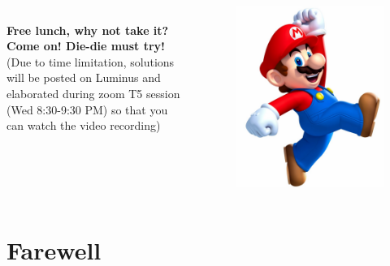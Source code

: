 \begin{frame}[fragile]{}
	\begin{columns}[t]
	\\\vspace{5pt}
	\textbf{Free lunch, why not take it?}\\
	\textbf{Come on! Die-die must try!}\\\vspace{10pt}
	(Due to time limitation, solutions will be posted on Luminus and elaborated during zoom T5 session (Wed 8:30-9:30 PM) so that you can watch the video recording)
	\begin{figure}
		\includegraphics[width=1\textwidth, trim=0 0 0 0, clip]{t5/images/mario.png}
	\end{figure}
\end{columns}
\end{frame}



\section*{Farewell}


